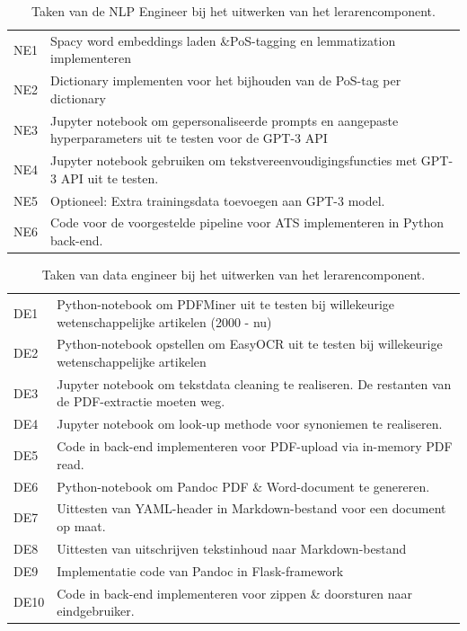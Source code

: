 \begin{center}
	\begin{table}[H]
		\begin{tabular}{ | m{2cm} | m{12cm} | } 
			\hline
			NE1 & Spacy word embeddings laden \&PoS-tagging en lemmatization implementeren \\
			NE2 & Dictionary implementen voor het bijhouden van de PoS-tag per dictionary \\
			NE3 & Jupyter notebook om gepersonaliseerde prompts en aangepaste hyperparameters uit te testen voor de GPT-3 API \\
			NE4 & Jupyter notebook gebruiken om tekstvereenvoudigingsfuncties met GPT-3 API uit te testen. \\
			NE5 & Optioneel: Extra trainingsdata toevoegen aan GPT-3 model. \\
			NE6 & Code voor de voorgestelde pipeline voor ATS implementeren in Python back-end. \\
			\hline
		\end{tabular}
		\caption{Taken van de NLP Engineer bij het uitwerken van het lerarencomponent.}
		\label{table:tasks-nlp-engineer}
	\end{table}
\end{center}


\begin{center}
	\begin{table}[H]
		\begin{tabular}{|m{2cm}|m{12cm}|}
			\hline
			DE1	& Python-notebook om PDFMiner uit te testen bij willekeurige wetenschappelijke artikelen (2000 - nu) \\
			DE2 & Python-notebook opstellen om EasyOCR uit te testen bij willekeurige wetenschappelijke artikelen \\
			DE3 & Jupyter notebook om tekstdata cleaning te realiseren. De restanten van de PDF-extractie moeten weg. \\
			DE4 & Jupyter notebook om look-up methode voor synoniemen te realiseren. \\
			DE5 & Code in back-end implementeren voor PDF-upload via in-memory PDF read. \\
			DE6 & Python-notebook om Pandoc PDF \& Word-document te genereren. \\
			DE7 & Uittesten van YAML-header in Markdown-bestand voor een document op maat. \\
			DE8 & Uittesten van uitschrijven tekstinhoud naar Markdown-bestand \\
			DE9 & Implementatie code van Pandoc in Flask-framework \\
			DE10 & Code in back-end implementeren voor zippen \& doorsturen naar eindgebruiker. \\
			\hline
		\end{tabular}
		\caption{Taken van data engineer bij het uitwerken van het lerarencomponent.}
		\label{table:tasks-data-engineer}
	\end{table}
\end{center}

